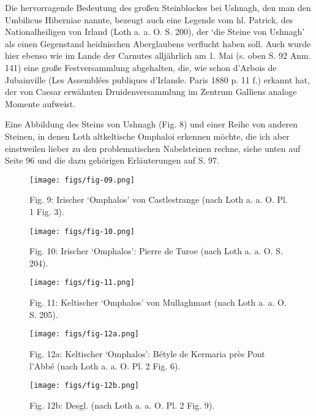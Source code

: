 \documentclass[a4paper, 11pt, oneside]{article}
\begin{document}
Die hervorragende Bedeutung des großen Steinblockes bei Ushnagh, den man den Umbilicus Hiberniae nannte, bezeugt auch eine Legende vom hl. Patrick, des Nationalheiligen von Irland (Loth a. a. O. S. 200), der `die Steine von Ushnagh' als einen Gegenstand heidnischen Aberglaubens verflucht haben soll. Auch wurde hier ebenso wie im Lande der Carnutes alljährlich am 1. Mai (s. oben S. 92 Anm. 141) eine große Festversammlung abgehalten, die, wie schon d'Arbois de Jubainville (Les Assemblées publiques d'Irlande. Paris 1880 p. 11 f.) erkannt hat, der von Caesar erwähnten Druidenversammlung im Zentrum Galliens analoge Momente aufweist.

Eine Abbildung des Steins von Ushnagh (Fig. 8) und einer Reihe von anderen Steinen, in denen Loth altkeltische Omphaloi erkennen möchte, die ich aber einstweilen lieber zu den problematischen Nabelsteinen rechne, siehe unten auf Seite 96 und die dazu gehörigen Erläuterungen auf S. 97.
\clearpage
\vspace*{\fill}
\begin{figure}[H]
\centering
\texttt{[image: figs/fig-09.png]}
\caption{Fig. 9: Irischer `Omphalos' von Castlestrange (nach Loth a. a. O. Pl. 1 Fig. 3).}
\end{figure}
\begin{figure}[H]
\centering
\texttt{[image: figs/fig-10.png]}
\caption{Fig. 10: Irischer `Omphalos': Pierre de Turoe (nach Loth a. a. O. S. 204).}
\end{figure}
\vspace*{\fill}
\clearpage
\vspace*{\fill}
\begin{figure}[H]
\centering
\texttt{[image: figs/fig-11.png]}
\caption{Fig. 11: Keltischer `Omphalos' von Mullaghmast (nach Loth a. a. O. S. 205).}
\end{figure}
\vspace*{\fill}
\clearpage
\vspace*{\fill}
\begin{figure}[H]
\centering
\texttt{[image: figs/fig-12a.png]}
\caption{Fig. 12a: Keltischer `Omphalos': Bétyle de Kermaria près Pont l'Abbé (nach Loth a. a. O. Pl. 2 Fig. 6).}
\end{figure}
\begin{figure}[H]
\centering
\texttt{[image: figs/fig-12b.png]}
\caption{Fig. 12b: Desgl. (nach Loth a. a. O. Pl. 2 Fig. 9).}
\end{figure}
\vspace*{\fill}
\clearpage
\end{document}
